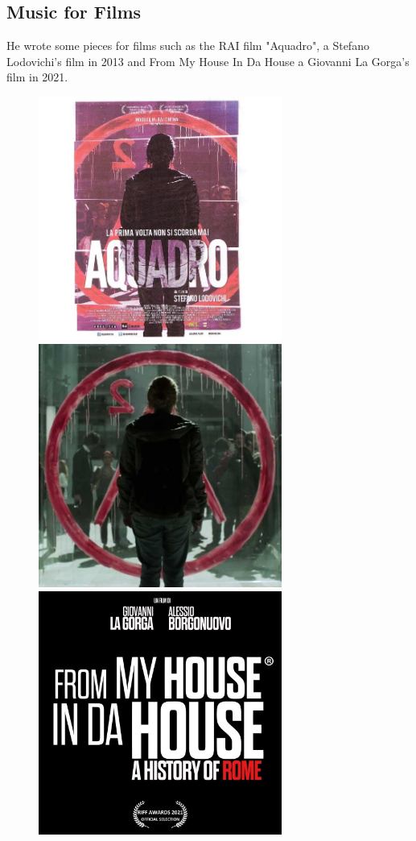 \documentclass[12pt,landscape]{article}
\begin{document}
{\begin{center}
\section*{Music for Films}

He wrote some pieces for films such as the
\newline
RAI film "Aquadro", a Stefano Lodovichi's film in 2013 and
\newline
From My House In Da House a Giovanni La Gorga's film in 2021.

\begin{figure}[!htb]
  \includegraphics[width=8cm]{aquadrocover.jpg}

\endminipage\hfill
{}
  \includegraphics[width=8cm]{aquadroscene.jpg}

\endminipage\hfill
{}%
  \includegraphics[width=8cm]{frommycover.jpg}


\end{figure}
\end{center}}
\end{document}
